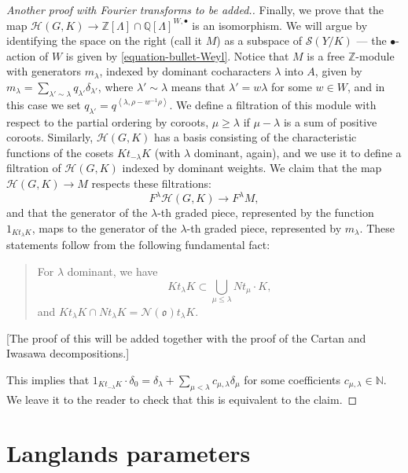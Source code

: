 \begin{proof}
 [Another proof with Fourier transforms to be added.]
 
 Finally, we prove that the map $\mathcal H(G,K) \to  \mathbb Z[\Lambda]\cap \mathbb Q[\Lambda]^{W,\bullet}$ is an isomorphism. We will argue by identifying the space on the right (call it $M$) as a subspace of $\mathcal S(Y/K)$ --- the $\bullet$-action of $W$ is given by \eqref{equation-bullet-Weyl}. Notice that $M$ is a free $\mathbb Z$-module with generators $m_\lambda$, indexed by dominant cocharacters $\lambda$ into $A$, given by $m_\lambda= \sum_{\lambda'\sim \lambda} q_{\lambda'} \delta_{\lambda'}$, where $\lambda' \sim \lambda$ means that $\lambda'=w\lambda$ for some $w\in W$, and in this case we set $q_{\lambda'} = q^{\left < \lambda, \rho - w^{-1}\rho\right>}$. We define a filtration of this module with respect to the partial ordering by coroots, $\mu \ge \lambda$ if $\mu-\lambda$ is a sum of positive coroots. Similarly, $\mathcal H(G,K)$ has a basis consisting of the characteristic functions of the cosets $Kt_{-\lambda} K$ (with $\lambda$ dominant, again), and we use it to define a filtration of $\mathcal H(G,K)$ indexed by dominant weights. We claim that the map $\mathcal H(G,K)\to M$ respects these filtrations:
 $$ F^\lambda \mathcal H(G,K)\to F^\lambda M,$$
 and that the generator of the $\lambda$-th graded piece, represented by the function $1_{Kt_\lambda K}$, maps to the generator of the $\lambda$-th graded piece, represented by $m_\lambda$. These statements follow from the following fundamental fact:
 
 \begin{quote}
  For $\lambda$ dominant, we have 
\begin{equation}
\label{equation-Hecke-action-preflag} 
K t_\lambda K \subset \bigcup_{\mu\le \lambda} N t_\mu\cdot K,
\end{equation}
and $K t_\lambda K \cap N t_\lambda K = \mathcal N(\mathfrak o)  t_\lambda  K$. 
 \end{quote}

 [The proof of this will be added together with the proof of the Cartan and Iwasawa decompositions.]
 
This implies that $1_{K t_{-\lambda} K} \cdot \delta_0 = \delta_\lambda + \sum_{\mu<\lambda} c_{\mu,\lambda} \delta_\mu$ for some coefficients $c_{\mu, \lambda}\in\mathbb N$. We leave it to the reader to check that this is equivalent to the claim.
 
\end{proof}

\section{Langlands parameters}
\label{section-Langlands-parameters}

